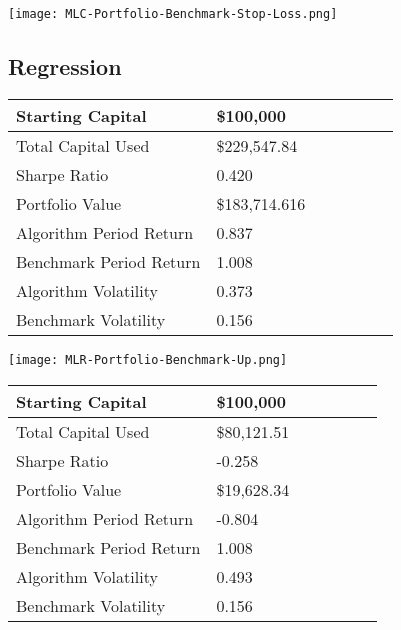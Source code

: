 \begin{center}  
    \texttt{[image: MLC-Portfolio-Benchmark-Stop-Loss.png]}
    \label{fig:nonfloat}
\end{center}

\subsection{Regression}

\begin{center}
    \begin{tabular}{ | l | l | l | | l | l | l | p{5cm} |}
    \hline
    Starting Capital & \$100,000 \\ \hline
    Total Capital Used & \$229,547.84 \\ \hline
    Sharpe Ratio & 0.420 \\ \hline
    Portfolio Value & \$183,714.616 \\ \hline
    Algorithm Period Return & 0.837 \\ \hline
    Benchmark Period Return & 1.008 \\ \hline
    Algorithm Volatility & 0.373 \\ \hline
    Benchmark Volatility & 0.156 \\
    \hline
    \end{tabular}
    \label{table:nonfloat}
\end{center}

\begin{center}  
    \texttt{[image: MLR-Portfolio-Benchmark-Up.png]}
    \label{fig:nonfloat}
\end{center}

\begin{center}
    \begin{tabular}{ | l | l | l | | l | l | l | p{5cm} |}
    \hline
    Starting Capital & \$100,000 \\ \hline
    Total Capital Used & \$80,121.51 \\ \hline
    Sharpe Ratio & -0.258 \\ \hline
    Portfolio Value & \$19,628.34 \\ \hline
    Algorithm Period Return & -0.804 \\ \hline
    Benchmark Period Return & 1.008 \\ \hline
    Algorithm Volatility & 0.493 \\ \hline
    Benchmark Volatility & 0.156 \\
    \hline
    \end{tabular}
    \label{table:nonfloat}
\end{center}

